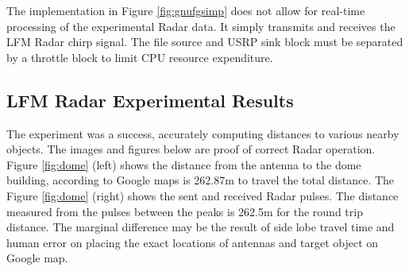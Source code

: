 \documentclass[letterpaper, 12 pt, conference]{report}
\numberwithin{figure}{section}
\begin{document}
The implementation in Figure \ref{fig:gnufgsimp} does not allow for real-time processing of the experimental Radar data. It simply transmits and receives the LFM Radar chirp signal. The file source and USRP sink block must be separated by a throttle block to limit CPU resource expenditure.  

\subsection{LFM Radar Experimental Results}
The experiment was a success, accurately computing distances to various nearby objects. The images and figures below are proof of correct Radar operation.\\
\newline
Figure \ref{fig:dome} (left) shows the distance from the antenna to the dome building, according to Google maps is 262.87m to travel the total distance. The Figure \ref{fig:dome} (right) shows the sent and received Radar pulses. The distance measured from the pulses between the peaks is 262.5m for the round trip distance. The marginal difference may be the result of side lobe travel time and human error on placing the exact locations of antennas and target object on Google map.\\
\end{document}
